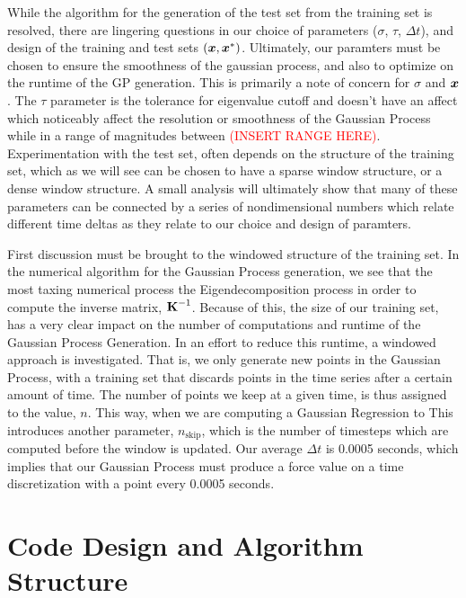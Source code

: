 \documentclass{article}
\begin{document}
While the algorithm for the generation of the test set from the training set is resolved, there are lingering questions in our choice of parameters ($\sigma$, $\tau$, $\Delta t$), and design of the training and test sets $(\boldsymbol{x}, \boldsymbol{x}^*)$. Ultimately, our paramters must be chosen to ensure the smoothness of the gaussian process, and also to optimize on the runtime of the GP generation. This is primarily a note of concern for $\sigma$ and $\boldsymbol{x}$. The $\tau$ parameter is the tolerance for eigenvalue cutoff and doesn't have an affect which noticeably affect the resolution or smoothness of the Gaussian Process while in a range of magnitudes between \textcolor{red}{(INSERT RANGE HERE)}. Experimentation with the test set, often depends on the structure of the training set, which as we will see can be chosen to have a sparse window structure, or a dense window structure. A small analysis will ultimately show that many of these parameters can be connected by a series of nondimensional numbers which relate different time deltas as they relate to our choice and design of paramters. 

First discussion must be brought to the windowed structure of the training set. In the numerical algorithm for the Gaussian Process generation, we see that the most taxing numerical process the Eigendecomposition process in order to compute the inverse matrix, $\boldsymbol{\mathrm{K}}^{-1}$. Because of this, the size of our training set, has a very clear impact on the number of computations and runtime of the Gaussian Process Generation. In an effort to reduce this runtime, a windowed approach is investigated. That is, we only generate new points in the Gaussian Process, with a training set that discards points in the time series after a certain amount of time. The number of points we keep at a given time, is thus assigned to the value, $n$. This way, when we are computing a Gaussian Regression to This introduces another parameter, $n_{\text{skip}}$, which is the number of timesteps which are computed before the window is updated. Our average $\Delta t$ is 0.0005 seconds, which implies that our Gaussian Process must produce a force value on a time discretization with a point every 0.0005 seconds. 


\section{Code Design and Algorithm Structure}
\end{document}
